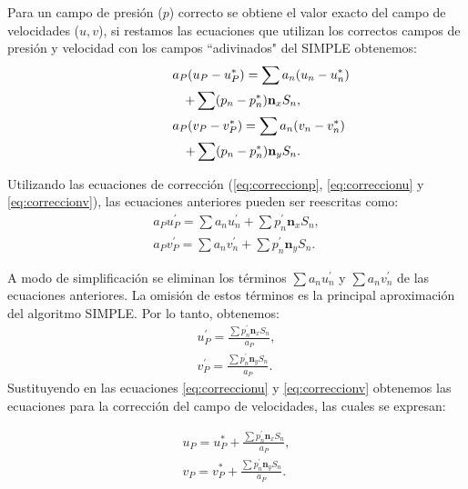 \documentclass[a4paper,10pt, oneside]{book}
\begin{document}
Para un campo de presión ($p$) correcto se obtiene el valor exacto del campo de velocidades ($u,v$), si restamos las ecuaciones que utilizan los correctos campos de presión y velocidad con los campos ``adivinados" del SIMPLE obtenemos:
\begin{eqnarray}
  \lefteqn{a_{P}(u_{P} - u_{P}^*) = \sum a_{n}(u_{n} - u_{n}^*)} \nonumber \\
  && + \sum (p_n - p^*_n) \mathbf{n}_x S_n, \nonumber \\
  \lefteqn{a_{P}(v_{P} - v_{P}^*) = \sum a_{n}(v_{n} - v_{n}^*) } \nonumber \\
  && + \sum (p_n - p^*_n) \mathbf{n}_y S_n. \nonumber
\end{eqnarray}

Utilizando las ecuaciones de corrección (\ref{eq:correccionp}, \ref{eq:correccionu} y \ref{eq:correccionv}), las ecuaciones anteriores pueden ser reescritas como:
\begin{eqnarray}
  a_{P}u_{P}^\prime = \sum a_{n} u_{n}^\prime + \sum p_n^\prime \mathbf{n}_x S_n, \nonumber \\
  a_{P}v_{P}^\prime = \sum a_{n} v_{n}^\prime + \sum p_n^\prime \mathbf{n}_y S_n. \nonumber
\end{eqnarray}

A modo de simplificación se eliminan los términos $\sum a_{n}u_{n}^\prime$ y $\sum a_{n}v_{n}^\prime$ de las ecuaciones anteriores. La omisión de estos términos es la principal aproximación del algoritmo SIMPLE. Por lo tanto, obtenemos:
\begin{eqnarray}
  u_{P}^\prime = \frac{\sum p_n^\prime \mathbf{n}_x S_n}{a_P}, \nonumber \\
  v_{P}^\prime = \frac{\sum p_n^\prime \mathbf{n}_y S_n}{a_P}.
  \label{eq:SimpleCorreccion1}
\end{eqnarray}
Sustituyendo en las ecuaciones \ref{eq:correccionu} y \ref{eq:correccionv} obtenemos las ecuaciones para la corrección del campo de velocidades, las cuales se expresan:

\begin{eqnarray}
  u_{P} = u_{P}^* + \frac{\sum p_n^\prime \mathbf{n}_x S_n}{a_P}, \nonumber\\
  v_{P} = v_{P}^* + \frac{\sum p_n^\prime \mathbf{n}_y S_n}{a_P}.
  \label{eq:SimpleCorreccion2}
\end{eqnarray}
\end{document}
